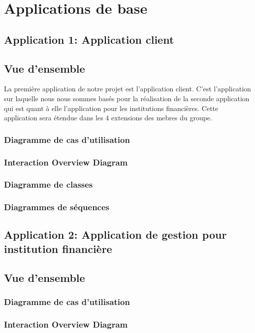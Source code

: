 \documentclass[french, a4paper, 12pt]{article}
\begin{document}
\newpage
\section{Applications de base}
	\subsection{Application 1: Application client}
	\subsection{Vue d'ensemble}
		La première application de notre projet est l'application client. C'est l'application sur laquelle nous nous sommes basés pour la réalisation de la seconde application qui est quant à elle l'application pour les institutions financières. Cette application sera étendue dans les 4 extensions des mebres du groupe.
		
		\subsubsection{Diagramme de cas d'utilisation}
		\subsubsection{Interaction Overview Diagram}
		\subsubsection{Diagramme de classes}
		\subsubsection{Diagrammes de séquences}
	
	\subsection{Application 2: Application de gestion pour institution financière}
	\subsection{Vue d'ensemble}
		\subsubsection{Diagramme de cas d'utilisation}
		\subsubsection{Interaction Overview Diagram}
\end{document}
